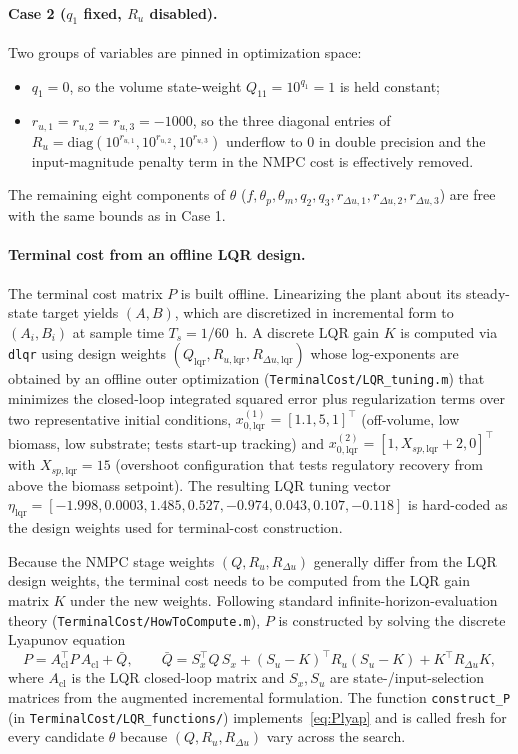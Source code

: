\documentclass[11pt,a4paper]{article}
\newcommand{\Ts}{T_s}
\begin{document}
\paragraph{Case 2 ($q_1$ fixed, $R_u$ disabled).} Two groups of variables are pinned in optimization space:
\begin{itemize}
    \item $q_1 = 0$, so the volume state-weight $Q_{11} = 10^{q_1} = 1$ is held constant;
    \item $r_{u,1} = r_{u,2} = r_{u,3} = -1000$, so the three diagonal entries of $R_u = \mathrm{diag}(10^{r_{u,1}}, 10^{r_{u,2}}, 10^{r_{u,3}})$ underflow to $0$ in double precision and the input-magnitude penalty term in the NMPC cost is effectively removed.
\end{itemize}
The remaining eight components of $\theta$ ($f, \theta_p, \theta_m, q_2, q_3, r_{\Delta u,1}, r_{\Delta u,2}, r_{\Delta u,3}$) are free with the same bounds as in Case 1.


\paragraph{Terminal cost from an offline LQR design.}
The terminal cost matrix $P$ is built offline. Linearizing the plant about its steady-state target yields $(A, B)$, which are discretized in incremental form to $(A_i, B_i)$ at sample time $\Ts = 1/60$~h. A discrete LQR gain $K$ is computed via \texttt{dlqr} using design weights $(Q_{\mathrm{lqr}}, R_{u,\mathrm{lqr}}, R_{\Delta u,\mathrm{lqr}})$ whose log-exponents are obtained by an offline outer optimization (\texttt{TerminalCost/LQR\_tuning.m}) that minimizes the closed-loop integrated squared error plus regularization terms over two representative initial conditions, $x_{0,\mathrm{lqr}}^{(1)} = [1.1, 5, 1]^\top$ (off-volume, low biomass, low substrate; tests start-up tracking) and $x_{0,\mathrm{lqr}}^{(2)} = [1, X_{sp,\mathrm{lqr}}+2, 0]^\top$ with $X_{sp,\mathrm{lqr}} = 15$ (overshoot configuration that tests regulatory recovery from above the biomass setpoint). The resulting LQR tuning vector $\eta_{\mathrm{lqr}} = [-1.998, 0.0003, 1.485, 0.527, -0.974, 0.043, 0.107, -0.118]$ is hard-coded as the design weights used for terminal-cost construction.

Because the NMPC stage weights $(Q, R_u, R_{\Delta u})$ generally differ from the LQR design weights, the terminal cost needs to be computed from the LQR gain matrix $K$ under the new weights. Following standard infinite-horizon-evaluation theory (\texttt{TerminalCost/HowToCompute.m}), $P$ is constructed by solving the discrete Lyapunov equation
\begin{equation}
\label{eq:Plyap}
P = A_{\mathrm{cl}}^\top P\, A_{\mathrm{cl}} + \bar Q, \qquad
\bar Q = S_x^\top Q\, S_x + (S_u - K)^\top R_u (S_u - K) + K^\top R_{\Delta u} K,
\end{equation}
where $A_{\mathrm{cl}}$ is the LQR closed-loop matrix and $S_x, S_u$ are state-/input-selection matrices from the augmented incremental formulation. The function \texttt{construct\_P} (in \texttt{TerminalCost/LQR\_functions/}) implements~\eqref{eq:Plyap} and is called fresh for every candidate $\theta$ because $(Q, R_u, R_{\Delta u})$ vary across the search.
\end{document}
